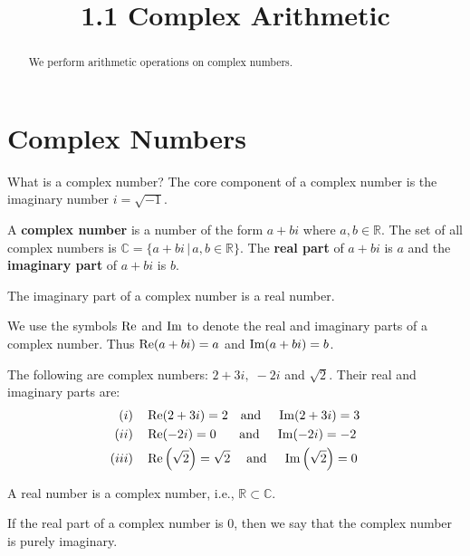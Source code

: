 \documentclass[handout]{ximera}
\title{1.1 Complex Arithmetic}
\begin{document}
\begin{abstract}
We perform arithmetic operations on complex numbers.
\end{abstract}

\maketitle

\section{Complex Numbers}

What is a complex number?  The core component of a complex number is the imaginary number $i = \sqrt{-1}$.

\begin{definition}
A {\bf complex number} is a number of the form $a+bi$ where $a,b \in \mathbb{R}$. 
The set of all complex numbers is $\mathbb{C}= \{a+bi \,|\, a,b \in \mathbb{R}\}$. 
The {\bf real part} of $a+bi$ is $a$ and the {\bf imaginary part} of $a+bi$ is $b$.
\end{definition}

\begin{remark}
The imaginary part of a complex number is a real number.
\end{remark}

We use the symbols $\operatorname{Re}$ and $\operatorname{Im}$ to denote the real and imaginary parts of a complex number.
Thus $\operatorname{Re}(a+bi) = a$ and $\operatorname{Im}(a+bi) = b$.


\begin{example}[Example 1] 
The following are complex numbers: $2+3i, \; -2i$ and $\sqrt 2$.
Their real and imaginary parts are:
\begin{align*}
(i)& \quad \operatorname{Re}(2+3i) = 2 \quad \mbox{and} \quad \;\operatorname{Im}(2+3i) = 3 \\
(ii)& \quad \operatorname{Re}(-2i) = 0 \quad \;\;\; \mbox{and} \quad \;\operatorname{Im}(-2i) = -2 \\
(iii)& \quad \operatorname{Re}\left(\sqrt 2\right) = \sqrt 2 \quad \;\mbox{and} \quad \;\operatorname{Im}\left(\sqrt 2\right) = 0 
\end{align*}

\end{example}


\begin{remark}
A real number is a complex number, i.e., $\mathbb{R} \subset \mathbb{C}$.
\end{remark}
\begin{remark}
If the real part of a complex number is $0$, then we say that the complex number is purely imaginary. 
\end{remark}
\end{document}
